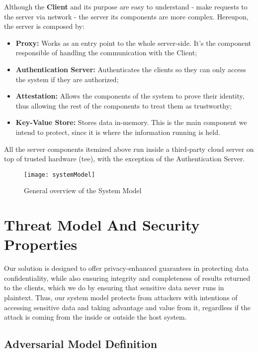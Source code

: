 Although the \textbf{Client} and its purpose are easy to understand - make requests to the server via network - the server its components are more complex. Hereupon, the server is composed by: 
\begin{itemize}
	\item \textbf{Proxy:} Works as an entry point to the whole server-side. It's the component responsible of handling the communication with the Client;
	\item \textbf{Authentication Server:} Authenticates the clients so they can only access the system if they are authorized;
	\item \textbf{Attestation:} Allows the components of the system to prove their identity, thus allowing the rest of the components to treat them as trustworthy;
	\item \textbf{Key-Value Store:} Stores data in-memory. This is the main component we intend to protect, since it is where the information running is held.
\end{itemize} 


All the server components itemized above run inside a third-party cloud server on top of trusted hardware (\gls{tee}), with the exception of the Authentication Server.

\vspace{5mm}
\begin{figure}[htbp]
	\centering
	{\texttt{[image: systemModel]}}
	\caption{General overview of the System Model}
	\label{fig:systemModel}
\end{figure}


\section{Threat Model And Security Properties} %
\label{sec:threatModel_and_securityProperties}

Our solution is designed to offer privacy-enhanced guarantees in protecting data confidentiality, while also ensuring integrity and completeness of results returned to the clients, which we do by ensuring that sensitive data never runs in plaintext. 
Thus, our system model protects from attackers with intentions of accessing sensitive data and taking advantage and value from it, regardless if the attack is coming from the inside or outside the host system.


\subsection{Adversarial Model Definition}

